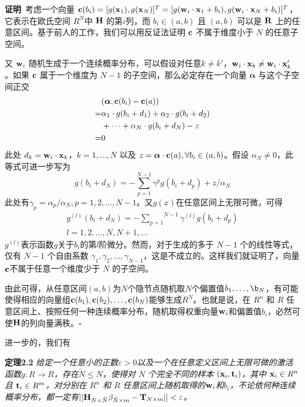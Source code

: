\documentclass[conference]{IEEEtran}
\begin{document}
\textbf{证明}\ 考虑一个向量 ${\bf c}(b_i)=[g({\bf x}_1),g({\bf x}_N)]^T=[g({\bf w}_i\cdot{\bf x}_1+b_i),g({\bf w}_i\cdot{\bf x}_N+b_i)]^T$，它表示在欧氏空间 $R^N$中 ${\bf H}$ 的第$i$列，而 $b_i\in(a,b)$ 且 $(a,b)$ 可以是 ${\bf R}$ 上的任意区间。基于前人的工作，我们可以用反证法证明 ${\bf c}$ 不属于维度小于 $N$ 的任意子空间。

又 ${\bf w}_i$ 随机生成于一个连续概率分布，可以假设对任意$k\ne k'$，${\bf w}_i\cdot {\bf x}_k \ne {\bf w}_i\cdot {\bf x}_k'$。如果 ${\bf c}$ 属于一个维度为 $N-1$ 的子空间，那么必定存在一个向量 ${\bm \alpha}$ 与这个子空间正交
\begin{equation}\label{eq6}
	\begin{split}
		&({\bm \alpha},{\bf c}(b_i)-{\bf c}(a))\\
		=&{\alpha}_1\cdot g(b_i+d_1)+{\alpha}_2\cdot g(b_i+d_2)\\
		&+\dots+{\alpha}_N\cdot g(b_i+d_N)-z\\
		=&0
	\end{split}
\end{equation}
此处 $d_k={\bf w}_i\cdot{\bf x}_k$，$k=1,\dots,N$ 以及 $z={\bm \alpha}\cdot{\bf c}(a), \forall b_i\in(a,b)$。假设 $\alpha_N\ne0$，此等式可进一步写为
\begin{equation}\label{eq7}
	g(b_i+d_N)=-\overset{N-1} {\underset {p=1}\sum}\gamma^p g(b_i+d_p)+z/\alpha_N
\end{equation}
此处有$\gamma_p=\alpha_p/\alpha_N, p=1,2,\dots,N-1$。又$g(x)$在任意区间上无限可微，可得
\begin{equation}\label{eq8}
	\begin{split}
		g^{(l)}(b_i+d_N)=-\overset{N-1} {\underset {p=1}\sum}\gamma^{(l)} g(b_i+d_p)\\
		l=1,2,\dots,N,N+1,\dots
	\end{split}
\end{equation}
$g^{(l)}$表示函数$g$关于$b_i$的第$l$阶微分。然而，对于生成的多于 $N-1$ 个的线性等式，仅有 $N-1$ 个自由系数 $\gamma_1,\gamma_2,\dots,\gamma_{N-1}$，这是不成立的。这样我们就证明了，向量${\bf c}$不属于任意一个维度少于 $N$ 的子空间。

由此可得，从任意区间$(a,b)$为$N$个隐节点随机取$N$个偏置值$b_1,\dots,\b_N$，有可能使得相应的向量组${\bf c}(b_1),{\bf c}(b_2),\dots,{\bf c}(b_N)$能够生成$R^N$。也就是说，在 $R^n$ 和 $R$ 任意区间上、按照任何一种连续概率分布，随机取得权重向量${\bf w}_i$和偏置值$b_i$，必然可使${\bf H}$的列向量满秩。$\square$

进一步的，我们有

\textbf{定理2.2}\textit{
	给定一个任意小的正数$\varepsilon>0$以及一个在任意定义区间上无限可微的激活函数$g: R\rightarrow R$，存在${\tilde{N}\le N}$，使得对 $N$ 个完全不同的样本 $({\bf x}_i,{\bf t}_i )$，其中 ${\bf x}_i\in R^n$ 且 ${\bf t}_i\in R^m$，对分别在 $R^n$ 和 $R$ 任意区间上随机取得的${\bf w}_i$和$b_i$，不论依何种连续概率分布，都一定有$||{\bf H}_{N\times \tilde{N}}\beta_{\tilde{N}\times m}-{\bf T}_{N\times m}||<\varepsilon$。
}
\end{document}
